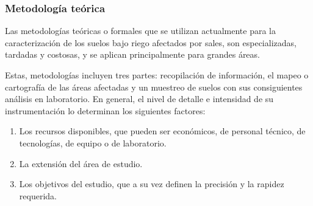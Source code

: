 \subsubsection{Metodología teórica}
Las metodologías teóricas o formales que se utilizan actualmente para la caracterización de los suelos bajo riego afectados por sales, son especializadas, tardadas y costosas, y se aplican principalmente para grandes áreas.

Estas, metodologías incluyen tres partes: recopilación de información, el mapeo o cartografía de las áreas afectadas y un muestreo de suelos con sus consiguientes análisis en laboratorio. En general, el nivel de detalle e intensidad de su instrumentación lo determinan los siguientes factores:
\begin{enumerate}
  \item Los recursos disponibles, que pueden ser económicos, de personal técnico, de tecnologías, de equipo o de laboratorio.
  \item La extensión del área de estudio.
  \item Los objetivos del estudio, que a su vez definen la precisión y la rapidez requerida.
\end{enumerate}
